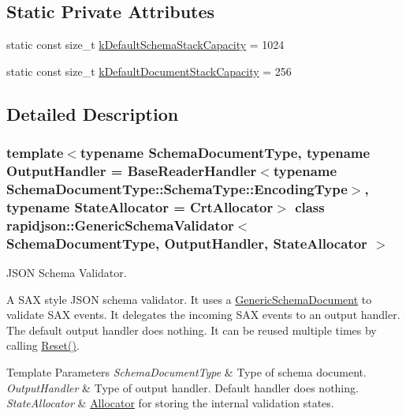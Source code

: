 \subsection*{Static Private Attributes}
\begin{DoxyCompactItemize}
\item 
static const size\+\_\+t \mbox{\hyperlink{classrapidjson_1_1_generic_schema_validator_ad11f6f1456ca3196a6ea4af85f0e7dca}{k\+Default\+Schema\+Stack\+Capacity}} = 1024
\item 
static const size\+\_\+t \mbox{\hyperlink{classrapidjson_1_1_generic_schema_validator_aa80da69ff44fff7e6e62d2444359d4e6}{k\+Default\+Document\+Stack\+Capacity}} = 256
\end{DoxyCompactItemize}


\subsection{Detailed Description}
\subsubsection*{template$<$typename Schema\+Document\+Type, typename Output\+Handler = Base\+Reader\+Handler$<$typename Schema\+Document\+Type\+::\+Schema\+Type\+::\+Encoding\+Type$>$, typename State\+Allocator = Crt\+Allocator$>$\newline
class rapidjson\+::\+Generic\+Schema\+Validator$<$ Schema\+Document\+Type, Output\+Handler, State\+Allocator $>$}

J\+S\+ON Schema Validator. 

A S\+AX style J\+S\+ON schema validator. It uses a {\ttfamily \mbox{\hyperlink{classrapidjson_1_1_generic_schema_document}{Generic\+Schema\+Document}}} to validate S\+AX events. It delegates the incoming S\+AX events to an output handler. The default output handler does nothing. It can be reused multiple times by calling {\ttfamily \mbox{\hyperlink{classrapidjson_1_1_generic_schema_validator_afe6cd0d9088a1d4cf8100c0efc9f76fc}{Reset()}}}.


\begin{DoxyTemplParams}{Template Parameters}
{\em Schema\+Document\+Type} & Type of schema document. \\
\hline
{\em Output\+Handler} & Type of output handler. Default handler does nothing. \\
\hline
{\em State\+Allocator} & \mbox{\hyperlink{classrapidjson_1_1_allocator}{Allocator}} for storing the internal validation states. \\
\hline
\end{DoxyTemplParams}


